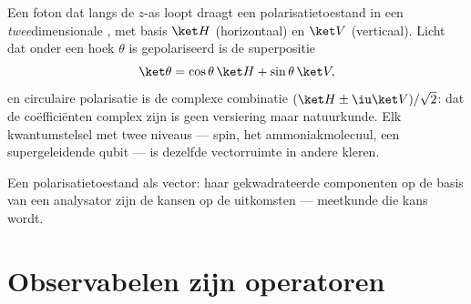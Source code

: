 \begin{example}\label{ex:b3:quantum-formalism:polarization}
Een foton dat langs de $z$-as loopt draagt een polarisatietoestand in een
\emph{twee}dimensionale , met basis $\ket H$ (horizontaal)
en $\ket V$ (verticaal). Licht dat onder een hoek $\theta$ is
gepolariseerd is de superpositie
\[
\ket\theta = \cos\theta\,\ket H + \sin\theta\,\ket V ,
\]
en circulaire polarisatie is de complexe combinatie $(\ket H \pm
\iu\ket V)/\sqrt2$: dat de coëfficiënten complex zijn is geen versiering
maar natuurkunde. Elk kwantumstelsel met twee niveaus --- spin, het
ammoniakmolecuul, een supergeleidende qubit --- is dezelfde vectorruimte
in andere kleren.
\end{example}

\begin{omfigure}

{\small Een polarisatietoestand als vector: haar gekwadrateerde
componenten op de basis van een analysator zijn de kansen op de uitkomsten
--- meetkunde die kans wordt.}
\end{omfigure}

\section{Observabelen zijn operatoren}

